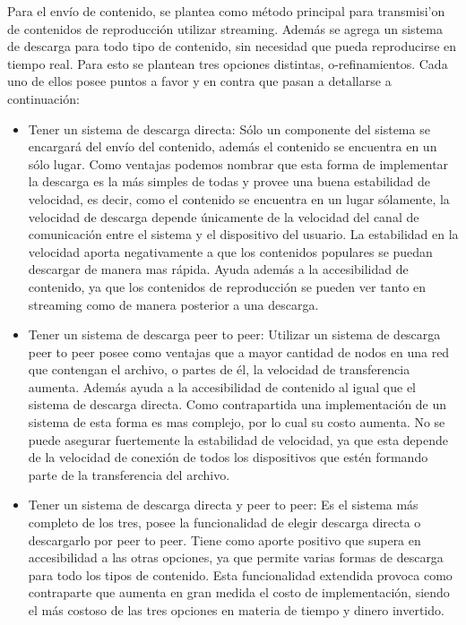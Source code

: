 \documentclass[11pt, a4paper, spanish]{article}
\begin{document}
	Para el env\'io de contenido, se plantea como m\'etodo principal para transmisi'on de contenidos de reproducci\'on utilizar streaming. Adem\'as se agrega un sistema de descarga para todo tipo de contenido, sin necesidad que pueda reproducirse en tiempo real. Para esto se plantean tres opciones distintas, o-refinamientos. Cada uno de ellos posee puntos a favor y en contra que pasan a detallarse a continuaci\'on:
		\begin{itemize}
		\item {Tener un sistema de descarga directa: S\'olo un componente del sistema se encargar\'a del env\'io del contenido, adem\'as el contenido se encuentra en un s\'olo lugar. Como ventajas podemos nombrar que esta forma de implementar la descarga es la m\'as simples de todas y provee una buena estabilidad de velocidad, es decir, como el contenido se encuentra en un lugar s\'olamente, la velocidad de descarga depende \'unicamente de la velocidad del canal de comunicaci\'on entre el sistema y el dispositivo del usuario. La estabilidad en la velocidad aporta negativamente a que los contenidos populares se puedan descargar de manera mas r\'apida. Ayuda adem\'as a la accesibilidad de contenido, ya que los contenidos de reproducci\'on se pueden ver tanto en streaming como de manera posterior a una descarga.}
		\item {Tener un sistema de descarga peer to peer: Utilizar un sistema de descarga peer to peer  posee como ventajas que a mayor cantidad de nodos en una red que contengan el archivo, o partes de \'el, la velocidad de transferencia aumenta. Adem\'as ayuda a la accesibilidad de contenido al igual que el sistema de descarga directa. Como contrapartida una implementaci\'on de un sistema de esta forma es mas complejo, por lo cual su costo aumenta. No se puede asegurar fuertemente la estabilidad de velocidad, ya que esta depende de la velocidad de conexi\'on de todos los dispositivos que est\'en formando parte de la transferencia del archivo.}
		\item {Tener un sistema de descarga directa y peer to peer: Es el sistema m\'as completo de los tres, posee la funcionalidad de elegir descarga directa o descargarlo por peer to peer. Tiene como aporte positivo que supera en accesibilidad a las otras opciones, ya que permite varias formas de descarga para todo los tipos de contenido. Esta funcionalidad extendida provoca como contraparte que aumenta en gran medida el costo de implementaci\'on, siendo el m\'as costoso de las tres opciones en materia de tiempo y dinero invertido.}
		\end{itemize}
\end{document}
